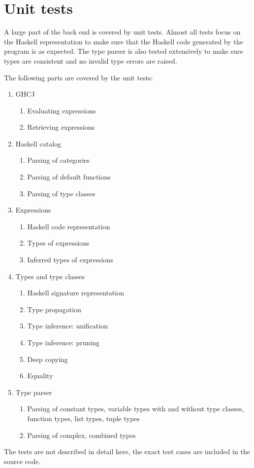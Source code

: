 \section{Unit tests} \label{unit tests}

A large part of the back end is covered by unit tests.
Almost all tests focus on the Haskell representation to make sure that the Haskell code generated by the program is as expected.
The type parser is also tested extensively to make sure types are consistent and no invalid type errors are raised.

The following parts are covered by the unit tests:

\begin{enumerate}
	\item GHCJ
	\begin{enumerate}
		\item Evaluating expressions
		\item Retrieving expressions
	\end{enumerate}
	\item Haskell catalog
	\begin{enumerate}
		\item Parsing of categories
		\item Parsing of default functions
		\item Parsing of type classes
	\end{enumerate}
	\item Expressions
	\begin{enumerate}
		\item Haskell code representation
		\item Types of expressions
		\item Inferred types of expressions
	\end{enumerate}
	\item Types and type classes
	\begin{enumerate}
		\item Haskell signature representation
		\item Type propagation
		\item Type inference: unification
		\item Type inference: pruning
		\item Deep copying
		\item Equality
	\end{enumerate}
	\item Type parser
	\begin{enumerate}
		\item Parsing of constant types, variable types with and without type classes, function types, list types, tuple types
		\item Parsing of complex, combined types
	\end{enumerate}
\end{enumerate}

The tests are not described in detail here, the exact test cases are included in the source code.
